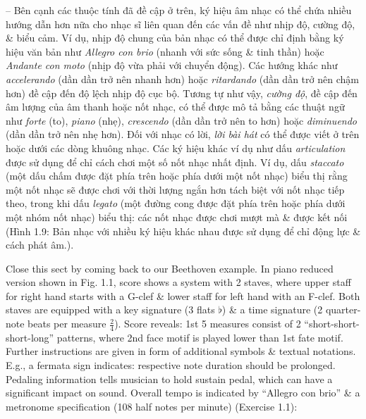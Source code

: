 \documentclass{article}
\begin{document}
\begin{itemize}
\begin{itemize}
\begin{itemize}
			-- Bên cạnh các thuộc tính đã đề cập ở trên, ký hiệu âm nhạc có thể chứa nhiều hướng dẫn hơn nữa cho nhạc sĩ liên quan đến các vấn đề như nhịp độ, cường độ, \& biểu cảm. Ví dụ, nhịp độ chung của bản nhạc có thể được chỉ định bằng ký hiệu văn bản như {\it Allegro con brio} (nhanh với sức sống \& tinh thần) hoặc {\it Andante con moto} (nhịp độ vừa phải với chuyển động). Các hướng khác như {\it accelerando} (dần dần trở nên nhanh hơn) hoặc {\it ritardando} (dần dần trở nên chậm hơn) đề cập đến độ lệch nhịp độ cục bộ. Tương tự như vậy, {\it cường độ}, đề cập đến âm lượng của âm thanh hoặc nốt nhạc, có thể được mô tả bằng các thuật ngữ như {\it forte} (to), {\it piano} (nhẹ), {\it crescendo} (dần dần trở nên to hơn) hoặc {\it diminuendo} (dần dần trở nên nhẹ hơn). Đối với nhạc có lời, {\it lời bài hát} có thể được viết ở trên hoặc dưới các dòng khuông nhạc. Các ký hiệu khác ví dụ như dấu {\it articulation} được sử dụng để chỉ cách chơi một số nốt nhạc nhất định. Ví dụ, dấu {\it staccato} (một dấu chấm được đặt phía trên hoặc phía dưới một nốt nhạc) biểu thị rằng một nốt nhạc sẽ được chơi với thời lượng ngắn hơn tách biệt với nốt nhạc tiếp theo, trong khi dấu {\it legato} (một đường cong được đặt phía trên hoặc phía dưới một nhóm nốt nhạc) biểu thị: các nốt nhạc được chơi mượt mà \& được kết nối ({\sf Hình 1.9: Bản nhạc với nhiều ký hiệu khác nhau được sử dụng để chỉ động lực \& cách phát âm.}).
			
			Close this sect by coming back to our Beethoven example. In piano reduced version shown in {\sf Fig. 1.1}, score shows a system with 2 staves, where upper staff for right hand starts with a G-clef \& lower staff for left hand with an F-clef. Both staves are equipped with a key signature (3 flats $\flat$) \& a time signature (2 quarter-note beats per measure $\frac{2}{4}$). Score reveals: 1st 5 measures consist of 2 ``short-short-short-long'' patterns, where 2nd face motif is played lower than 1st fate motif. Further instructions are given in form of additional symbols \& textual notations. E.g., a fermata sign indicates: respective note duration should be prolonged. Pedaling information tells musician to hold sustain pedal, which can have a significant impact on sound. Overall tempo is indicated by ``Allegro con brio'' \& a metronome specification (108 half notes per minute) (Exercise 1.1):
			

\end{itemize}
\end{itemize}
\end{itemize}
\end{document}
